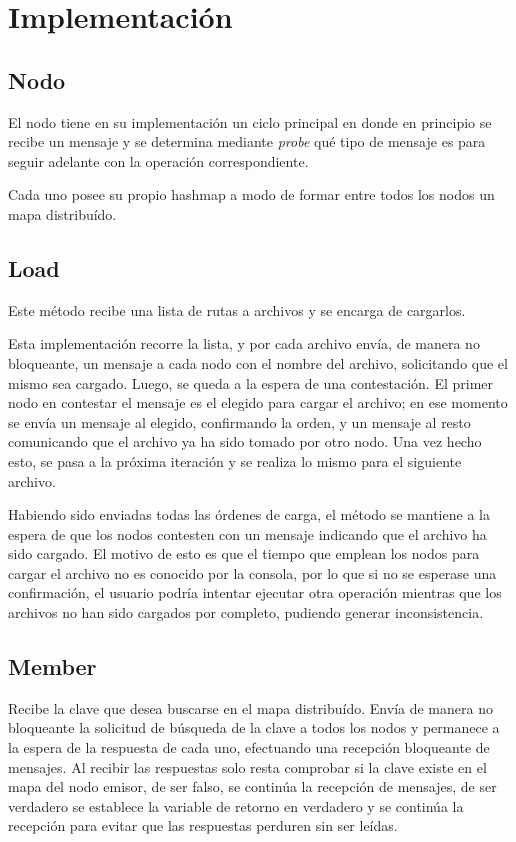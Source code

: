 \section{Implementación}

\subsection{Nodo}

El nodo tiene en su implementación un ciclo principal en donde en principio
se recibe un mensaje y se determina mediante \textit{probe} qué tipo de
mensaje es para seguir adelante con la operación correspondiente.

Cada uno posee su propio hashmap a modo de formar entre todos los nodos
un mapa distribuído.

\subsection{Load}

Este método recibe una lista de rutas a archivos y se encarga de cargarlos.

Esta implementación recorre la lista, y por cada archivo envía, de manera
no bloqueante, un mensaje a cada nodo con el nombre del archivo, solicitando
que el mismo sea cargado. Luego, se queda a la espera de una contestación. El
primer nodo en contestar el mensaje es el elegido para cargar el archivo; en
ese momento se envía un mensaje al elegido, confirmando la orden, y un mensaje
al resto comunicando que el archivo ya ha sido tomado por otro nodo. Una vez
hecho esto, se pasa a la próxima iteración y se realiza lo mismo para el
siguiente archivo.

Habiendo sido enviadas todas las órdenes de carga, el método se mantiene a la
espera de que los nodos contesten con un mensaje indicando que el archivo ha
sido cargado. El motivo de esto es que el tiempo que emplean los nodos para
cargar el archivo no es conocido por la consola, por lo que si no se esperase
una confirmación, el usuario podría intentar ejecutar otra operación mientras
que los archivos no han sido cargados por completo, pudiendo generar
inconsistencia.

\subsection{Member}

Recibe la clave que desea buscarse en el mapa distribuído. Envía de manera no
bloqueante la solicitud de búsqueda de la clave a todos los nodos y permanece
a la espera de la respuesta de cada uno, efectuando una recepción bloqueante
de mensajes. Al recibir las respuestas solo resta comprobar si la clave existe
en el mapa del nodo emisor, de ser falso, se continúa la recepción de
mensajes, de ser verdadero se establece la variable de retorno en verdadero y
se continúa la recepción para evitar que las respuestas perduren sin ser
leídas.

